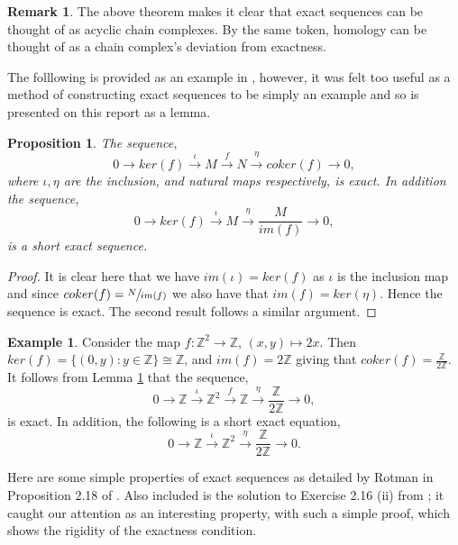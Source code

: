 \documentclass[11.5pt, twoside, a4paper, titlepage]{report}
\providecommand{\bb}[1]{\mathbb{#1}}
\theoremstyle{definition}
\newtheorem{rem}[mydef]{Remark}
\newtheorem{eg}[mydef]{Example}
\theoremstyle{plain}
\newtheorem{prop}[mydef]{Proposition}
\begin{document}
\begin{rem}
The above theorem makes it clear that exact sequences can be thought of as acyclic chain complexes. By the same token, homology can be thought of as a chain complex's deviation from exactness.
\end{rem}

The folllowing is provided as an example in \cite{Schiff}, however, it was felt too useful as a method of constructing exact sequences to be simply an example and so is presented on this report as a lemma.

\begin{prop} \label{cokerseqprop}
The sequence,
\begin{equation*}
0 \xrightarrow{} ker(f) \xrightarrow{\iota} M \xrightarrow{f} N \xrightarrow{\eta} coker(f) \xrightarrow{} 0,
\end{equation*} 
where $\iota , \eta$ are the inclusion, and natural maps respectively, is exact. In addition the sequence, 
\begin{equation*}
0\xrightarrow{} ker(f) \xrightarrow{\iota} M \xrightarrow{\eta} \frac{M}{im(f)} \xrightarrow{} 0,
\end{equation*}
is a short exact sequence.
\end{prop}
\begin{proof}
It is clear here that we have $im(\iota)=ker(f)$ as $\iota$ is the inclusion map and since $coker(f)=\sfrac{N}{im(f)}$ we also have that $im(f)=ker(\eta)$. Hence the sequence is exact. The second result follows a similar argument.
\end{proof}

\begin{eg}
Consider the map $f:\bb{Z}^2 \to \bb{Z}$, $(x, y)\mapsto 2x$. Then $ker(f)=\{(0,y):y\in \bb{Z}\}\cong \bb{Z}$, and $im(f)=2\bb{Z}$ giving that $coker(f)=\frac{\bb{Z}}{2\bb{Z}}$. It follows from Lemma \ref{cokerseqprop} that the sequence, 
\begin{equation*}
0 \xrightarrow{} \bb{Z} \xrightarrow{\iota} \bb{Z}^2 \xrightarrow{f} \bb{Z} \xrightarrow{\eta} \frac{\bb{Z}}{2\bb{Z}} \xrightarrow{} 0,
\end{equation*}
is exact. In addition, the following is a short exact equation,
\begin{equation*}
0\xrightarrow{} \bb{Z} \xrightarrow{\iota} \bb{Z}^2 \xrightarrow{\eta} \frac{\bb{Z}}{2\bb{Z}} \xrightarrow{}0.
\end{equation*}
\end{eg}

Here are some simple properties of exact sequences as detailed by Rotman in Proposition 2.18 of \cite{Rotman}. Also included is the solution to Exercise 2.16 (ii) from \cite{Rotman}; it caught our attention as an interesting property, with such a simple proof, which shows the rigidity of the exactness condition.
\end{document}
